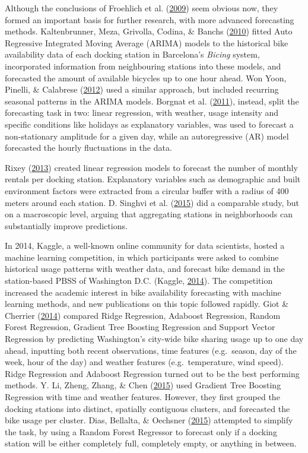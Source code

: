 \documentclass[12pt,oneside]{reedthesis}
\begin{document}
Although the conclusions of Froehlich et al.
(\protect\hyperlink{ref-froehlich2009}{2009}) seem obvious now, they
formed an important basis for further research, with more advanced
forecasting methods. Kaltenbrunner, Meza, Grivolla, Codina, \& Banchs
(\protect\hyperlink{ref-kaltenbrunner2010}{2010}) fitted Auto Regressive
Integrated Moving Average (ARIMA) models to the historical bike
availability data of each docking station in Barcelona's \emph{Bicing}
system, incorporated information from neighbouring stations into these
models, and forecasted the amount of available bicycles up to one hour
ahead. Won Yoon, Pinelli, \& Calabrese
(\protect\hyperlink{ref-won2012}{2012}) used a similar approach, but
included recurring seasonal patterns in the ARIMA models. Borgnat et al.
(\protect\hyperlink{ref-borgnat2011}{2011}), instead, split the
forecasting task in two: linear regression, with weather, usage
intensity and specific conditions like holidays as explanatory
variables, was used to forecast a non-stationary amplitude for a given
day, while an autoregressive (AR) model forecasted the hourly
fluctuations in the data.

Rixey (\protect\hyperlink{ref-rixley2013}{2013}) created linear
regression models to forecast the number of monthly rentals per docking
station. Explanatory variables such as demographic and built environment
factors were extracted from a circular buffer with a radius of 400
meters around each station. D. Singhvi et al.
(\protect\hyperlink{ref-singhvi2015}{2015}) did a comparable study, but
on a macroscopic level, arguing that aggregating stations in
neighborhoods can substantially improve predictions.

In 2014, Kaggle, a well-known online community for data scientists,
hosted a machine learning competition, in which participants were asked
to combine historical usage patterns with weather data, and forecast
bike demand in the station-based PBSS of Washington D.C. (Kaggle,
\protect\hyperlink{ref-kaggle}{2014}). The competition increased the
academic interest in bike availability forecasting with machine learning
methods, and new publications on this topic followed rapidly. Giot \&
Cherrier (\protect\hyperlink{ref-giot2014}{2014}) compared Ridge
Regression, Adaboost Regression, Random Forest Regression, Gradient Tree
Boosting Regression and Support Vector Regression by predicting
Washington's city-wide bike sharing usage up to one day ahead, inputting
both recent observations, time features (e.g.~season, day of the week,
hour of the day) and weather features (e.g.~temperature, wind speed).
Ridge Regression and Adaboost Regression turned out to be the best
performing methods. Y. Li, Zheng, Zhang, \& Chen
(\protect\hyperlink{ref-li2015}{2015}) used Gradient Tree Boosting
Regression with time and weather features. However, they first grouped
the docking stations into distinct, spatially contiguous clusters, and
forecasted the bike usage per cluster. Dias, Bellalta, \& Oechsner
(\protect\hyperlink{ref-dias2015}{2015}) attempted to simplify the task,
by using a Random Forest Regressor to forecast only if a docking station
will be either completely full, completely empty, or anything in
between.
\end{document}
